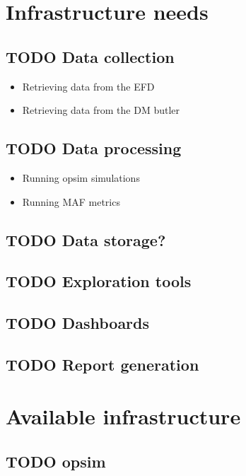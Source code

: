 \section{Infrastructure needs}
\label{sec:org9b24b48}
\subsection{{\bfseries\sffamily TODO} Data collection}
\label{sec:orgcb4a4b3}
\begin{itemize}
\item Retrieving data from the EFD
\label{sec:orgfe169ca}
\item Retrieving data from the DM butler
\label{sec:orga06a3cb}
\end{itemize}
\subsection{{\bfseries\sffamily TODO} Data processing}
\label{sec:org73bf02b}
\begin{itemize}
\item Running opsim simulations
\label{sec:org030fb99}
\item Running MAF metrics
\label{sec:org325cb18}
\end{itemize}
\subsection{{\bfseries\sffamily TODO} Data storage?}
\label{sec:orga32a3a3}
\subsection{{\bfseries\sffamily TODO} Exploration tools}
\label{sec:orgc45139f}
\subsection{{\bfseries\sffamily TODO} Dashboards}
\label{sec:org75d9aa7}
\subsection{{\bfseries\sffamily TODO} Report generation}
\label{sec:org4fa1995}
\section{Available infrastructure}
\label{sec:org310273d}
\subsection{{\bfseries\sffamily TODO} opsim}
\label{sec:orgff064f3}
